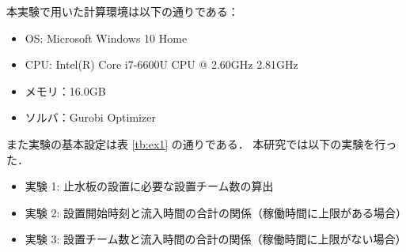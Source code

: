 \documentclass[a4paper,10pt]{jarticle}
\begin{document}
本実験で用いた計算環境は以下の通りである：
%
\vspace{-2mm}
%
\begin{itemize}
 \setlength{\parskip}{0cm} %
 \setlength{\itemsep}{0cm} %
 \item OS: Microsoft Windows 10 Home
 \item CPU: Intel(R) Core i7-6600U CPU @ 2.60GHz 2.81GHz
 \item メモリ：16.0GB
 \item ソルバ：Gurobi Optimizer
\end{itemize}

また実験の基本設定は表 \ref{tb:ex1} の通りである．
本研究では以下の実験を行った．
%
\vspace{-2mm}
%
\begin{itemize}
 \setlength{\parskip}{0cm} %
 \setlength{\itemsep}{0cm} %
 \item 実験 1: 止水板の設置に必要な設置チーム数の算出
 \item 実験 2: 設置開始時刻と流入時間の合計の関係（稼働時間に上限がある場合）
 \item 実験 3: 設置チーム数と流入時間の合計の関係（稼働時間に上限がない場合）
\end{itemize}
\end{document}
